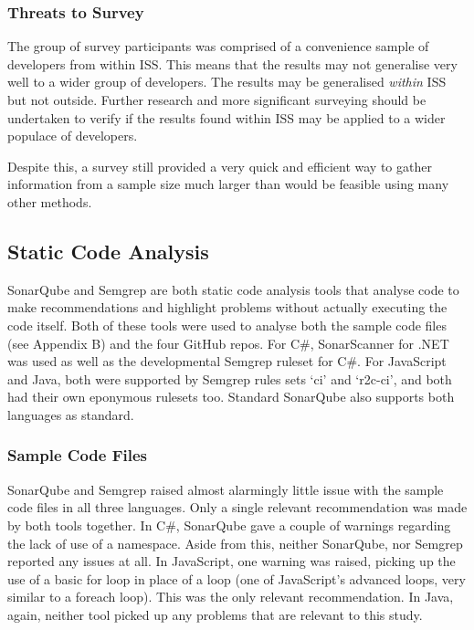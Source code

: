 \documentclass{article}
\begin{document}
        \subsubsection{Threats to Survey}
            The group of survey participants was comprised of a convenience sample of developers from within ISS. This means that the results may not generalise very well to a wider group of developers. The results may be generalised \emph{within} ISS but not outside. Further research and more significant surveying should be undertaken to verify if the results found within ISS may be applied to a wider populace of developers.

            Despite this, a survey still provided a very quick and efficient way to gather information from a sample size much larger than would be feasible using many other methods.

    \subsection{Static Code Analysis}
        SonarQube and Semgrep are both static code analysis tools that analyse code to make recommendations and highlight problems without actually executing the code itself. Both of these tools were used to analyse both the sample code files (see Appendix B) and the four GitHub repos. For C\#, SonarScanner for .NET was used as well as the developmental Semgrep ruleset for C\#. For JavaScript and Java, both were supported by Semgrep rules sets `ci' and `r2c-ci', and both had their own eponymous rulesets too. Standard SonarQube also supports both languages as standard.

        \subsubsection{Sample Code Files}
            SonarQube and Semgrep raised almost alarmingly little issue with the sample code files in all three languages. Only a single relevant recommendation was made by both tools together.
            In C\#, SonarQube gave a couple of warnings regarding the lack of use of a namespace. Aside from this, neither SonarQube, nor Semgrep reported any issues at all. In JavaScript, one warning was raised, picking up the use of a basic for loop in place of a  loop (one of JavaScript's advanced loops, very similar to a foreach loop). This was the only relevant recommendation. In Java, again, neither tool picked up any problems that are relevant to this study.
\end{document}
